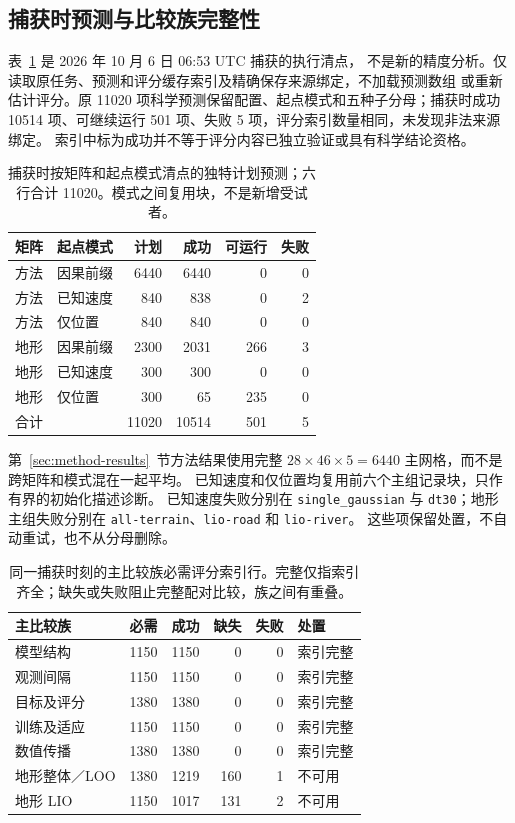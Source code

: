 \documentclass[UTF8,11pt]{ctexart}
\begin{document}
\subsection{捕获时预测与比较族完整性}
\label{sec:execution-coverage}
表~\ref{tab:execution-coverage} 是 2026 年 10 月 6 日 06:53 UTC 捕获的执行清点，
不是新的精度分析。仅读取原任务、预测和评分缓存索引及精确保存来源绑定，不加载预测数组
或重新估计评分。原 11020 项科学预测保留配置、起点模式和五种子分母；捕获时成功
10514 项、可继续运行 501 项、失败 5 项，评分索引数量相同，未发现非法来源绑定。
索引中标为成功并不等于评分内容已独立验证或具有科学结论资格。

\begin{table}[htbp]
\centering\small
\caption{捕获时按矩阵和起点模式清点的独特计划预测；六行合计 11020。模式之间复用块，不是新增受试者。}
\label{tab:execution-coverage}
\begin{tabular}{@{}llrrrr@{}}
\toprule
矩阵 & 起点模式 & 计划 & 成功 & 可运行 & 失败\\
\midrule
方法 & 因果前缀 & 6440 & 6440 & 0 & 0\\
方法 & 已知速度 & 840 & 838 & 0 & 2\\
方法 & 仅位置 & 840 & 840 & 0 & 0\\
地形 & 因果前缀 & 2300 & 2031 & 266 & 3\\
地形 & 已知速度 & 300 & 300 & 0 & 0\\
地形 & 仅位置 & 300 & 65 & 235 & 0\\
\midrule
合计 & & 11020 & 10514 & 501 & 5\\
\bottomrule
\end{tabular}
\end{table}

第~\ref{sec:method-results}~节方法结果使用完整 $28\times46\times5=6440$ 主网格，而不是跨矩阵和模式混在一起平均。
已知速度和仅位置均复用前六个主组记录块，只作有界的初始化描述诊断。
已知速度失败分别在 \texttt{single\_gaussian} 与 \texttt{dt30}；地形主组失败分别在
\texttt{all-terrain}、\texttt{lio-road} 和 \texttt{lio-river}。
这些项保留处置，不自动重试，也不从分母删除。

\begin{table}[htbp]
\centering\small
\caption{同一捕获时刻的主比较族必需评分索引行。完整仅指索引齐全；缺失或失败阻止完整配对比较，族之间有重叠。}
\label{tab:family-coverage}
\begin{tabular}{@{}lrrrrl@{}}
\toprule
主比较族 & 必需 & 成功 & 缺失 & 失败 & 处置\\
\midrule
模型结构 & 1150 & 1150 & 0 & 0 & 索引完整\\
观测间隔 & 1150 & 1150 & 0 & 0 & 索引完整\\
目标及评分 & 1380 & 1380 & 0 & 0 & 索引完整\\
训练及适应 & 1150 & 1150 & 0 & 0 & 索引完整\\
数值传播 & 1380 & 1380 & 0 & 0 & 索引完整\\
地形整体／LOO & 1380 & 1219 & 160 & 1 & 不可用\\
地形 LIO & 1150 & 1017 & 131 & 2 & 不可用\\
\bottomrule
\end{tabular}
\end{table}
\end{document}

